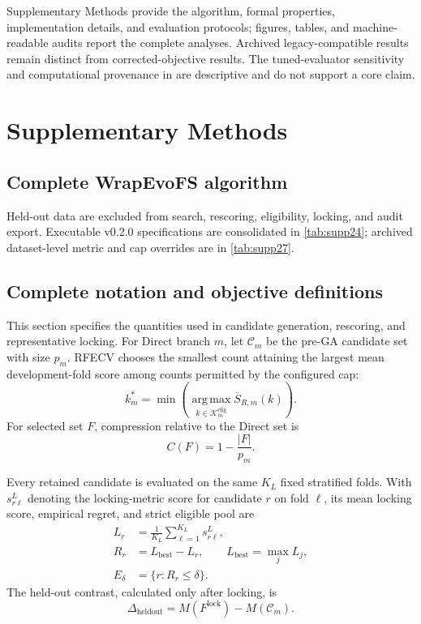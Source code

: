 \supplementarysetup
Supplementary Methods provide the algorithm, formal properties, implementation details, and evaluation protocols; figures, tables, and machine-readable audits report the complete analyses. Archived legacy-compatible results remain distinct from corrected-objective results. The tuned-evaluator sensitivity and computational provenance in  are descriptive and do not support a core claim.


\section{Supplementary Methods}

\subsection{Complete WrapEvoFS algorithm}



Held-out data are excluded from search, rescoring, eligibility, locking, and audit export. Executable v0.2.0 specifications are consolidated in \cref{tab:supp24}; archived dataset-level metric and cap overrides are in \cref{tab:supp27}.

\subsection{Complete notation and objective definitions}

This section specifies the quantities used in candidate generation, rescoring, and representative locking. For Direct branch $m$, let $\mathcal C_m$ be the pre-GA candidate set with size $p_m$. RFECV chooses the smallest count attaining the largest mean development-fold score among counts permitted by the configured cap:
\begin{equation}
k_m^{\ast}=\min\left(\operatorname*{arg\,max}_{k\in\mathcal K_m^{\mathrm{elig}}}\overline S_{R,m}(k)\right).
\end{equation}
For selected set $F$, compression relative to the Direct set is
\begin{equation}
C(F)=1-\frac{|F|}{p_m}.
\end{equation}

Every retained candidate is evaluated on the same $K_L$ fixed stratified folds. With $s^{L}_{r\ell}$ denoting the locking-metric score for candidate $r$ on fold $\ell$, its mean locking score, empirical regret, and strict eligible pool are
\begin{align}
L_r&=\frac{1}{K_L}\sum_{\ell=1}^{K_L}s^{L}_{r\ell},\\
R_r&=L_{\mathrm{best}}-L_r,\qquad L_{\mathrm{best}}=\max_jL_j,\\
E_\delta&=\{r:R_r\leq\delta\}.
\end{align}
The held-out contrast, calculated only after locking, is
\begin{equation}
\Delta_{\mathrm{heldout}}=M(F^{\mathrm{lock}})-M(\mathcal C_m).
\end{equation}

